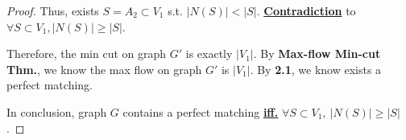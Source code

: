 \documentclass{article}
\begin{document}
\begin{proof}
    \hspace{1.3em}
    Thus, exists $S=A_2\subset V_1$ s.t. $|N(S)|<|S|$. \underline{\textbf{Contradiction}} to $\forall S\subset V_1, |N(S)|\geq|S|$.
    
    \hspace{1.3em}
    Therefore, the min cut on graph $G'$ is exactly $|V_1|.$ By \textbf{Max-flow Min-cut Thm.}, we know the max flow on graph $G'$ is $|V_1|$. By \textbf{2.1}, we know exists a perfect matching.
    
    \vspace{2em} \hspace{1.3em}
    In conclusion, graph $G$ contains a perfect matching \underline{\textbf{iff.}} $\forall S\subset V_1,\ |N(S)|\geq|S|$.
\end{proof}


\vspace{1em}
\end{document}
